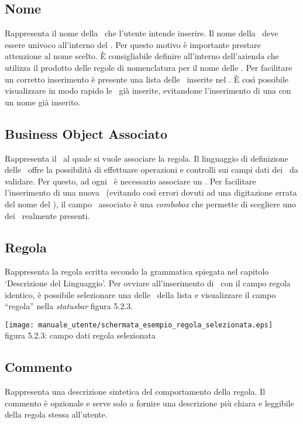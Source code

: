 \subsection{Nome}
Rappresenta il nome della \br\ che l'utente intende inserire. Il nome della \br\ deve essere univoco all'interno del \rp. Per questo motivo \`e importante prestare attenzione al nome scelto. \`E consigliabile definire all'interno dell'azienda che utilizza il prodotto delle regole di nomenclatura per il nome delle \br. Per facilitare un corretto inserimento \`e presente una lista delle \br\ inserite nel \rp. \`E cos\`i possibile visualizzare in modo rapido le \br\ gi\`a inserite, evitandone l'inserimento di una con un nome gi\`a inserito.

\subsection{Business Object Associato}
Rappresenta il \bo\ al quale si vuole associare la regola. Il linguaggio di definizione delle \br\ offre la possibilit\`a di effettuare operazioni e controlli sui campi dati dei \bo\ da validare. Per questo, ad ogni \br\ \`e necessario associare un \bo. Per facilitare l'inserimento di una nuova \br\ (evitando cos\`i errori dovuti ad una digitazione errata del nome del \bo), il campo \bo\ associato \`e una \textit{combobox} che permette di scegliere uno dei \bo\ realmente presenti.

\subsection{Regola}
Rappresenta la regola scritta secondo la grammatica spiegata nel capitolo `Descrizione del Linguaggio'. Per ovviare all'inserimento di \br\ con il campo regola identico, \`e possibile selezionare una delle \br\ della lista e visualizzare il campo ``regola'' nella \textit{statusbar} figura 5.2.3.

\begin{center}
\texttt{[image: manuale\_utente/schermata\_esempio\_regola\_selezionata.eps]}\\
 figura 5.2.3: campo dati regola selezionata
\end{center} 

\subsection{Commento}
Rappresenta una descrizione sintetica del comportamento della regola. Il commento \`e opzionale e serve solo a fornire una descrizione pi\`u chiara e leggibile della regola stessa all'utente.

